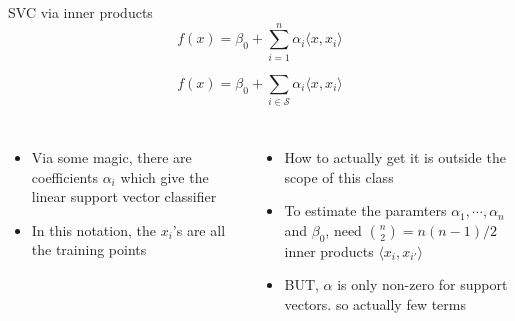 \documentclass[aspectratio=169,usenames,dvipsnames]{beamer}
\newcommand{\InstructorList}[1]{
\begin{itemize}
	\color{orange}
	#1
\end{itemize}
}
\begin{document}
\begin{frame}[t]{SVC via inner products}
	\centering
\begin{equation*}
	f(x) = \beta_0 + \sum_{i=1}^n \alpha_i \langle x, x_i \rangle
\end{equation*}

\begin{equation*}
	f(x) = \beta_0 + \sum_{i\in\mathcal{S}} \alpha_i \langle x, x_i \rangle
\end{equation*}

\begin{columns}
\centering

\InstructorList{
	\item Via some magic, there are coefficients $\alpha_i$ which give the linear support vector classifier 
	\item In this notation, the $x_i$'s are all the training points 
}

\centering
\InstructorList{
  \item How to actually get it is outside the scope of this class
  \item To estimate the paramters $\alpha_1,\cdots,\alpha_n$ and $\beta_0$, need $\binom{n}{2} = n(n-1)/2$ inner products $\langle x_i,x_{i'} \rangle$
  \item BUT, $\alpha$ is only non-zero for support vectors. so actually few terms
}


\end{columns}

\end{frame}

\end{document}
